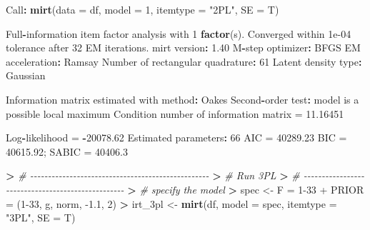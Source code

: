 \documentclass[
]{article}
\newenvironment{Shaded}{\begin{snugshade}}{\end{snugshade}}
\newcommand{\AttributeTok}[1]{\textcolor[rgb]{0.13,0.29,0.53}{#1}}
\newcommand{\CommentTok}[1]{\textcolor[rgb]{0.56,0.35,0.01}{\textit{#1}}}
\newcommand{\DecValTok}[1]{\textcolor[rgb]{0.00,0.00,0.81}{#1}}
\newcommand{\ErrorTok}[1]{\textcolor[rgb]{0.64,0.00,0.00}{\textbf{#1}}}
\newcommand{\FloatTok}[1]{\textcolor[rgb]{0.00,0.00,0.81}{#1}}
\newcommand{\FunctionTok}[1]{\textcolor[rgb]{0.13,0.29,0.53}{\textbf{#1}}}
\newcommand{\NormalTok}[1]{#1}
\newcommand{\OtherTok}[1]{\textcolor[rgb]{0.56,0.35,0.01}{#1}}
\newcommand{\SpecialCharTok}[1]{\textcolor[rgb]{0.81,0.36,0.00}{\textbf{#1}}}
\newcommand{\StringTok}[1]{\textcolor[rgb]{0.31,0.60,0.02}{#1}}
\begin{document}
\begin{Shaded}
\begin{Highlighting}[]
\NormalTok{Call}\SpecialCharTok{:}
\FunctionTok{mirt}\NormalTok{(}\AttributeTok{data =}\NormalTok{ df, }\AttributeTok{model =} \DecValTok{1}\NormalTok{, }\AttributeTok{itemtype =} \StringTok{"2PL"}\NormalTok{, }\AttributeTok{SE =}\NormalTok{ T)}

\NormalTok{Full}\SpecialCharTok{{-}}\NormalTok{information item factor analysis with }\DecValTok{1} \FunctionTok{factor}\NormalTok{(s).}
\NormalTok{Converged within }\FloatTok{1e{-}04}\NormalTok{ tolerance after }\DecValTok{32}\NormalTok{ EM iterations.}
\NormalTok{mirt version}\SpecialCharTok{:} \FloatTok{1.40} 
\NormalTok{M}\SpecialCharTok{{-}}\NormalTok{step optimizer}\SpecialCharTok{:}\NormalTok{ BFGS }
\NormalTok{EM acceleration}\SpecialCharTok{:}\NormalTok{ Ramsay }
\NormalTok{Number of rectangular quadrature}\SpecialCharTok{:} \DecValTok{61}
\NormalTok{Latent density type}\SpecialCharTok{:}\NormalTok{ Gaussian }

\NormalTok{Information matrix estimated with method}\SpecialCharTok{:}\NormalTok{ Oakes}
\NormalTok{Second}\SpecialCharTok{{-}}\NormalTok{order test}\SpecialCharTok{:}\NormalTok{ model is a possible local maximum}
\NormalTok{Condition number of information matrix }\OtherTok{=}  \FloatTok{11.16451}

\NormalTok{Log}\SpecialCharTok{{-}}\NormalTok{likelihood }\OtherTok{=} \SpecialCharTok{{-}}\FloatTok{20078.62}
\NormalTok{Estimated parameters}\SpecialCharTok{:} \DecValTok{66} 
\NormalTok{AIC }\OtherTok{=} \FloatTok{40289.23}
\NormalTok{BIC }\OtherTok{=} \FloatTok{40615.92}\NormalTok{; SABIC }\OtherTok{=} \FloatTok{40406.3}
\end{Highlighting}
\end{Shaded}

\begin{Shaded}
\begin{Highlighting}[]
\SpecialCharTok{\textgreater{}} \CommentTok{\# {-}{-}{-}{-}{-}{-}{-}{-}{-}{-}{-}{-}{-}{-}{-}{-}{-}{-}{-}{-}{-}{-}{-}{-}{-}{-}{-}{-}{-}{-}{-}{-}{-}{-}{-}{-}{-}{-}{-}{-}{-}{-}{-}{-}{-}{-}{-}{-}{-}{-}}
\ErrorTok{\textgreater{}} \CommentTok{\#                       Run 3PL}
\ErrorTok{\textgreater{}} \CommentTok{\# {-}{-}{-}{-}{-}{-}{-}{-}{-}{-}{-}{-}{-}{-}{-}{-}{-}{-}{-}{-}{-}{-}{-}{-}{-}{-}{-}{-}{-}{-}{-}{-}{-}{-}{-}{-}{-}{-}{-}{-}{-}{-}{-}{-}{-}{-}{-}{-}{-}{-}}
\ErrorTok{\textgreater{}} \CommentTok{\# specify the model}
\ErrorTok{\textgreater{}}\NormalTok{ spec }\OtherTok{\textless{}{-}} \StringTok{\textquotesingle{}F = 1{-}33}
\StringTok{+ PRIOR = (1{-}33, g, norm, {-}1.1, 2)\textquotesingle{}}
\SpecialCharTok{\textgreater{}}\NormalTok{ irt\_3pl }\OtherTok{\textless{}{-}} \FunctionTok{mirt}\NormalTok{(df, }\AttributeTok{model =}\NormalTok{ spec, }\AttributeTok{itemtype =} \StringTok{"3PL"}\NormalTok{, }\AttributeTok{SE =}\NormalTok{ T)  }
\end{Highlighting}
\end{Shaded}
\end{document}
